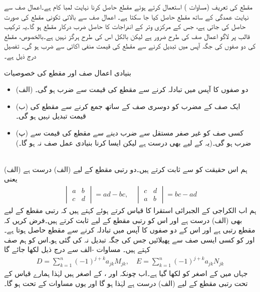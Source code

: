 مقطع کی تعریف (مساوات ) استعمال کرتے ہوئے مقطع حاصل کرنا نہایت لمبا کام ہے۔اعمال صف سے نہایت عمدگی کے ساتھ مقطع حاصل کیا جا سکتا ہے۔ اعمال صف سے بالائی تکونی مقطع کی صورت حاصل کی جاتی ہے، جس کے مرکزی وتر کے اندراجات کا حاصل ضرب درکار مقطع ہو گا۔یہ ترکیب قالب پر لاگو اعمال صف کی طرح ضرور ہے لیکن بالکل اس کی طرح ہرگز نہیں ہے۔بالخصوص، مقطع کی  دو صفوں  کی جگہ آپس میں تبدیل کرنے سے مقطع کی قیمت منفی اکائی  سے ضرب ہو گی۔ تفصیل درج ذیل ہے۔

\quad بنیادی اعمال صف اور مقطع کی خصوصیات\\
\begin{itemize}
\item{(الف)}
دو صفوں کا آپس میں تبادلہ کرنے سے مقطع کی قیمت  سے ضرب ہو گی۔
\item{(ب)}
ایک صف کے مضرب کو دوسری  صف کے ساتھ جمع کرنے سے مقطع کی قیمت تبدیل نہیں ہو گی۔
\item{(پ)}
کسی صف کو غیر صفر مستقل  سے ضرب دینے سے مقطع کی قیمت  سے ضرب ہو گی۔(یہ  کے لیے بھی درست ہے لیکن ایسا کرنا بنیادی عمل صف نہ ہو گا۔)
\end{itemize}

\\ 
 (الف) \quad  ہم اس حقیقت کو  سے ثابت کرتے ہیں۔دو رتبی  مقطع  کے لیے (الف) درست ہے  یعنی
\begin{align*}
\begin{vmatrix} a&b\\c&d \end{vmatrix}=ad-bc,\quad \begin{vmatrix} c&d\\a&b \end{vmatrix}=bc-ad
\end{align*}
ہم اب الکراجی کے الجبرائی  استقرا کا قیاس کرتے ہوئے کہتے ہیں کہ   رتبی مقطع کے لیے بھی (الف) درست ہے اور اس کو  رتبی مقطع کے لیے ثابت کرتے ہیں۔فرض کریں کہ   مقطع  رتبی ہے اور اس کے دو صفوں کا آپس میں تبادلہ کرنے سے  مقطع حاصل ہوتا ہے۔ اور  کو کسی ایسی صف سے پھیلائیں جس کی جگہ تبدیل نہ کی گئی ہو۔اس کو ہم  صف کہتے ہیں۔ مساوات -الف سے درج ذیل لکھا جائے گا
\begin{align}\label{مساوات_الجبرا_اصغر_مجموعہ_الف}
D=\sum_{k=1}^{n} (-1)^{j+k} a_{jk} M_{jk},\quad E=\sum_{k=1}^{n} (-1)^{j+k} a_{jk} N_{jk}
\end{align}
جہاں  میں  کے اصغر کو  لکھا گیا ہے۔اب چونکہ  اور ،   کے اصغر ہیں لہٰذا ہمارے قیاس کے تحت   رتبی مقطع کے لیے (الف) درست ہے لہٰذا  ہو گا اور یوں مساوات  کے تحت   ہو گا۔

